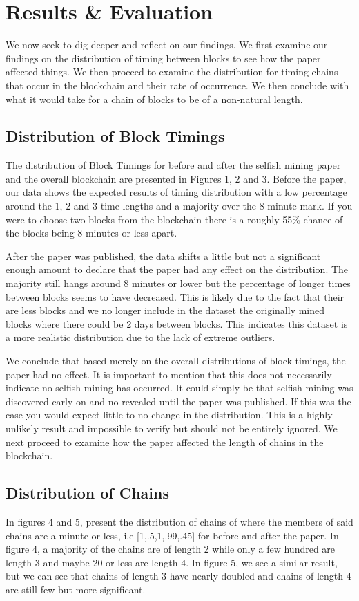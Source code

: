 \documentclass{sig-alternate-05-2015}
\begin{document}
\section{Results \& Evaluation}
We now seek to dig deeper and reflect on our findings. We first examine our findings on the distribution of timing between blocks to see how the paper affected things. We then proceed to examine the distribution for timing chains that occur in the blockchain and their rate of occurrence. We then conclude with what it would take for a chain of blocks to be of a non-natural length.  


\subsection{Distribution of Block Timings}
The distribution of Block Timings for before and after the selfish mining paper and the overall blockchain are presented in Figures 1, 2 and 3. Before the paper, our data shows the expected results of timing distribution with a low percentage around the 1, 2 and 3 time lengths and a majority over the 8 minute mark. If you were to choose two blocks from the blockchain there is a roughly 55\% chance of the blocks being 8 minutes or less apart. 

After the paper was published, the data shifts a little but not a significant enough amount to declare that the paper had any effect on the distribution. The majority still hangs around 8 minutes or lower but the percentage of longer times between blocks seems to have decreased. This is likely due to the fact that their are less blocks and we no longer include in the dataset the originally mined blocks where there could be 2 days between blocks. This indicates this dataset is a more realistic distribution due to the lack of extreme outliers.

We conclude that based merely on the overall distributions of block timings, the paper had no effect. It is important to mention that this does not necessarily indicate no selfish mining has occurred. It could simply be that selfish mining was discovered early on and no revealed until the paper was published. If this was the case you would expect little to no change in the distribution. This is a highly unlikely result and impossible to verify but should not be entirely ignored. We next proceed to examine how the paper affected the length of chains in the blockchain. 

\subsection{Distribution of Chains}
In figures 4 and 5, present the distribution of chains of where the members of said chains are a minute or less, i.e [1,.5,1,.99,.45] for before and after the paper. In figure 4, a majority of the chains are of length 2 while only a few hundred are length 3 and maybe 20 or less are length 4. In figure 5, we see a similar result, but we can see that chains of length 3 have nearly doubled and chains of length 4 are still few but more significant. 
\end{document}
